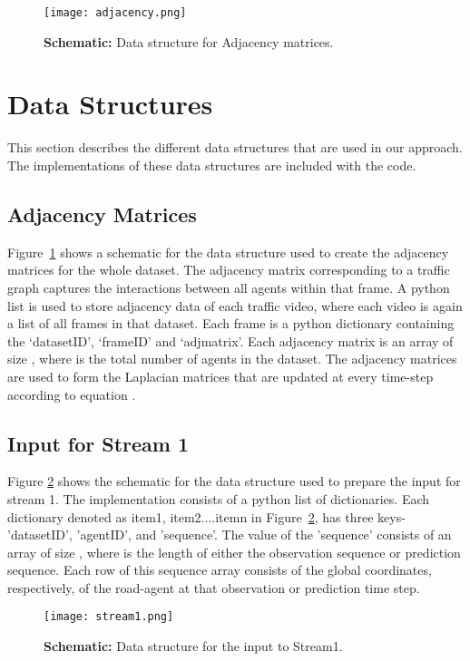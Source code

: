 \documentclass[10pt,twocolumn,letterpaper]{article}
\theoremstyle{plain}
\begin{document}
%
 

\begin{figure}[t]
\texttt{[image: adjacency.png]}
    \caption{\textbf{Schematic:} Data structure for Adjacency matrices.}
\label{fig:adjacency}
\end{figure}
\section{Data Structures}
\label{sec: dat_structures}
This section describes the different data structures that are used in our approach. The implementations of these data structures are included with the code. 

\subsection{Adjacency Matrices}
Figure~\ref{fig:adjacency} shows a schematic for the data structure used to create the adjacency matrices for the whole dataset. The adjacency matrix corresponding to a traffic graph captures the interactions between all agents within that frame. A python list is used to store adjacency data of each traffic video, where each video is again a list of all frames in that dataset. Each frame is a python dictionary containing the `datasetID', `frameID' and `adjmatrix'. Each adjacency matrix is an array of size , where  is the total number of agents in the dataset. The adjacency matrices are used to form the Laplacian matrices that are updated at every time-step according to equation .

\subsection{Input for Stream 1}
Figure \ref{fig:stream1} shows the schematic for the data structure used to prepare the input for stream 1. The implementation consists of a python list of dictionaries. Each dictionary denoted as item1, item2....itemn in Figure~\ref{fig:stream1}, has three keys- 'datasetID', 'agentID', and 'sequence'. The value of the 'sequence' consists of an array of size , where  is the length of either the observation sequence or prediction sequence. Each row of this sequence array consists of the global  coordinates, respectively, of the road-agent at that observation or prediction time step.  

\begin{figure}[h]
    \texttt{[image: stream1.png]}
    \caption{\textbf{Schematic:} Data structure for the input to Stream1.}
\label{fig:stream1}
\end{figure}
\end{document}
